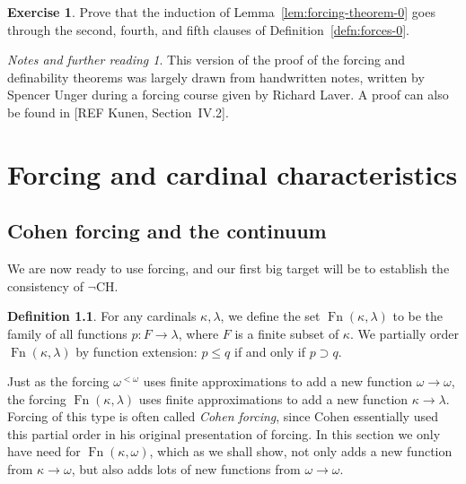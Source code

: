 \documentclass[11pt,oneside]{amsbook}
\DeclareMathOperator{\Fn}{Fn}
\theoremstyle{definition}
\newtheorem{exerc}{Exercise}[section]
\theoremstyle{plain}
\theoremstyle{definition}
\newtheorem{defn}[thm]{Definition}
\theoremstyle{remark}
\newtheorem*{notes}{Notes and further reading}
\begin{document}
\begin{exerc}
  \label{exerc:forcing-clauses-245}
  Prove that the induction of Lemma~\ref{lem:forcing-theorem-0} goes through the second, fourth, and fifth clauses of Definition~\ref{defn:forces-0}.
\end{exerc}

\begin{notes}
  This version of the proof of the forcing and definability theorems was largely drawn from handwritten notes, written by Spencer Unger during a forcing course given by Richard Laver. A proof can also be found in [REF Kunen, Section~IV.2].
\end{notes}


\chapter{Forcing and cardinal characteristics}

\section{Cohen forcing and the continuum}

We are now ready to use forcing, and our first big target will be to establish the consistency of $\neg$CH.

\begin{defn}
  For any cardinals $\kappa,\lambda$, we define the set $\Fn(\kappa,\lambda)$ to be the family of all functions $p\colon F\to\lambda$, where $F$ is a finite subset of $\kappa$. We partially order $\Fn(\kappa,\lambda)$ by function extension: $p\leq q$ if and only if $p\supset q$.
\end{defn}

Just as the forcing $\omega^{<\omega}$ uses finite approximations to add a new function $\omega\to\omega$, the forcing $\Fn(\kappa,\lambda)$ uses finite approximations to add a new function $\kappa\to\lambda$. Forcing of this type is often called \emph{Cohen forcing}, since Cohen essentially used this partial order in his original presentation of forcing. In this section we only have need for $\Fn(\kappa,\omega)$, which as we shall show, not only adds a new function from $\kappa\to\omega$, but also adds lots of new functions from $\omega\to\omega$.
\end{document}
